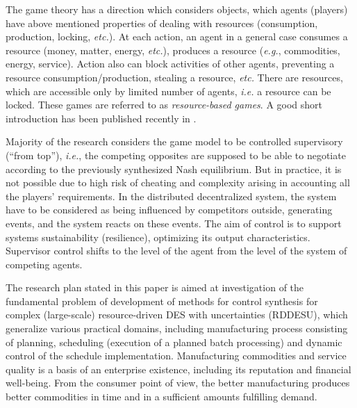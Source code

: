 \documentclass[conference]{IEEEtran}
\begin{document}

The game theory has a direction which considers objects, which agents (players) have above mentioned properties of dealing with resources (consumption, production, locking, \emph{etc.}).  At each action, an agent in a general case consumes a resource (money, matter, energy, \emph{etc.}), produces a resource (\emph{e.g.}, commodities, energy, service).  Action also can block activities of other agents, preventing a resource consumption/production, stealing a resource, \emph{etc.}  There are resources, which are accessible only by limited number of agents, \emph{i.e.} a resource can be locked. These games are referred to as \emph{resource-based games}. A good short introduction has been published recently in \cite{rbg}.

Majority of the research considers the game model to be controlled supervisory (``from top''), \emph{i.e.}, the competing opposites are supposed to be able to negotiate according to the previously synthesized Nash equilibrium. But in practice, it is not possible due to high risk of cheating and complexity arising in accounting all the players’ requirements. In the distributed decentralized system, the system have to be considered as being influenced by competitors outside, generating events, and the system reacts on these events. The aim of control is to support systems sustainability (resilience), optimizing its output characteristics. Supervisor control shifts to the level of the agent from the level of the system of competing agents. %

The research plan stated in this paper is aimed at investigation of the fundamental problem of development of methods for control synthesis for complex (large-scale) resource-driven DES with uncertainties (RDDESU), which generalize various practical domains, including manufacturing process consisting of planning, scheduling (execution of a planned batch processing) and dynamic control of the schedule implementation.  Manufacturing commodities and service quality is a basis of an enterprise existence, including its reputation and financial well-being. From the consumer point of view, the better manufacturing produces better commodities in time and in a sufficient amounts fulfilling demand.
\end{document}
